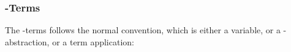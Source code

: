 {\subsubsection*{\lambda-Terms}

The \lambda-terms follows the normal convention, which is either a variable, or a \lambda-abstraction, or a term application:

\begin{code}%
\>[0]\AgdaSpace{}%
\AgdaSpace{}%
\AgdaSymbol{:}\AgdaSpace{}%
\AgdaSpace{}%
\AgdaSpace{}%
\AgdaSpace{}%
\AgdaSpace{}%
\AgdaSpace{}%
\<%
\\
\>[0][@{}l@{\AgdaIndent{0}}]%
\>[2]\AgdaSpace{}%
\AgdaSymbol{:}\AgdaSpace{}%
\AgdaSpace{}%
\AgdaSpace{}%
\AgdaSpace{}%
\AgdaSpace{}%
\AgdaSpace{}%
\AgdaSpace{}%
\<%
\\
%
\>[2]\AgdaSpace{}%
\AgdaSymbol{:}\AgdaSpace{}%
\AgdaSpace{}%
\AgdaSymbol{(}\AgdaSpace{}%
\AgdaSpace{}%
\AgdaSymbol{)}\AgdaSpace{}%
\AgdaSpace{}%
\AgdaSpace{}%
\AgdaSpace{}%
\AgdaSpace{}%
\AgdaSymbol{(}\AgdaSpace{}%
\AgdaSpace{}%
\AgdaSymbol{)}\<%
\\
%
\>[2]\AgdaSpace{}%
\AgdaSymbol{:}\AgdaSpace{}%
\AgdaSpace{}%
\AgdaSpace{}%
\AgdaSymbol{(}\AgdaSpace{}%
\AgdaSpace{}%
\AgdaSymbol{)}\AgdaSpace{}%
\AgdaSpace{}%
\AgdaSpace{}%
\AgdaSpace{}%
\AgdaSpace{}%
\AgdaSpace{}%
\AgdaSpace{}%
\AgdaSpace{}%
\<%
\end{code}

\begin{code}[hide]%
\>[0]\AgdaSpace{}%
\AgdaSpace{}%
\AgdaSpace{}%
\AgdaSymbol{:}\AgdaSpace{}%
\AgdaSpace{}%
\AgdaSpace{}%
\<%
\end{code}

}
